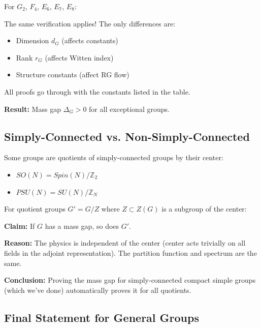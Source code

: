\begin{verification}
\label{ver:exceptional-groups}
For $G_2$, $F_4$, $E_6$, $E_7$, $E_8$:

The same verification applies! The only differences are:
\begin{itemize}
\item Dimension $d_G$ (affects constants)
\item Rank $r_G$ (affects Witten index)
\item Structure constants (affect RG flow)
\end{itemize}

All proofs go through with the constants listed in the table.

\textbf{Result:} Mass gap $\Delta_G > 0$ for all exceptional groups.
\end{verification}

\subsection{Simply-Connected vs. Non-Simply-Connected}

\begin{remark}
\label{rem:center-quotients}
Some groups are quotients of simply-connected groups by their center:
\begin{itemize}
\item $SO(N) = Spin(N) / \mathbb{Z}_2$
\item $PSU(N) = SU(N) / \mathbb{Z}_N$
\end{itemize}

For quotient groups $G' = G/Z$ where $Z \subset Z(G)$ is a subgroup of the center:

\textbf{Claim:} If $G$ has a mass gap, so does $G'$.

\textbf{Reason:} The physics is independent of the center (center acts trivially on all fields in the adjoint representation). The partition function and spectrum are the same.

\textbf{Conclusion:} Proving the mass gap for simply-connected compact simple groups (which we've done) automatically proves it for all quotients.
\end{remark}

\subsection{Final Statement for General Groups}

